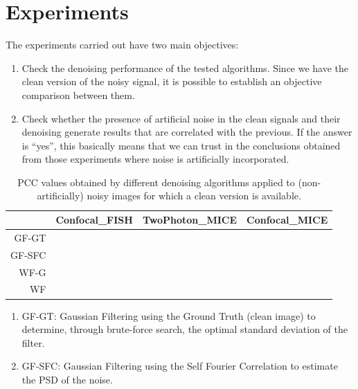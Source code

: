 \documentclass{article}
\begin{document}

\section{Experiments}

The experiments carried out have two main objectives:
\begin{enumerate}
\item Check the denoising performance of the tested algorithms. Since
  we have the clean version of the noisy signal, it is possible to
  establish an objective comparison between them.
\item Check whether the presence of artificial noise in the clean
  signals and their denoising generate results that are correlated
  with the previous. If the answer is ``yes'', this basically means
  that we can trust in the conclusions obtained from those experiments
  where noise is artificially incorporated.
\end{enumerate}

\begin{table}
  \centering
  \begin{tabular}{r|ccc}
    ~~ & Confocal\_FISH & TwoPhoton\_MICE & Confocal\_MICE \\
    \hline
    GF-GT & & & \\
    GF-SFC & & \\
    WF-G & & \\
    WF & & & \\
  \end{tabular}  
  \caption{PCC values obtained by different denoising algorithms
    applied to (non-artificially) noisy images for which a clean version
    is available.}
\end{table}

\begin{enumerate}
\item GF-GT: Gaussian Filtering using the Ground Truth (clean image)
  to determine, through brute-force search, the optimal standard
  deviation of the filter.
\item GF-SFC: Gaussian Filtering using the Self Fourier Correlation to
  estimate the PSD of the noise.
\end{enumerate}


\appendix

\makeatletter
\renewcommand*{\thesection}{%
  \AlphAlph{\value{section}}%
}
\makeatother
\end{document}
